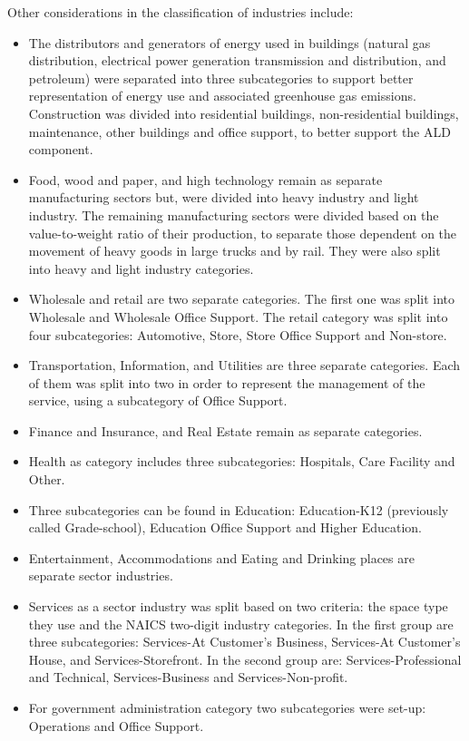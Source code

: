 
Other considerations in the classification of industries include:
\begin{itemize}
\item The distributors and generators of energy used in buildings (natural gas distribution, electrical power generation transmission and distribution, and petroleum) were separated into three subcategories to support better representation of energy use and associated greenhouse gas emissions. Construction was divided into residential buildings, non-residential buildings, maintenance, other buildings and office support, to better support the ALD component.
\item Food, wood and paper, and high technology remain as separate manufacturing sectors but, were divided into heavy industry and light industry. The remaining manufacturing sectors were divided based on the value-to-weight ratio of their production, to separate those dependent on the movement of heavy goods in large trucks and by rail. They were also split into heavy and light industry categories.
\item Wholesale and retail are two separate categories. The first one was split into Wholesale and Wholesale Office Support. The retail category was split into four subcategories: Automotive, Store, Store Office Support and Non-store.
\item Transportation, Information, and Utilities are three separate categories. Each of them was split into two in order to represent the management of the service, using a subcategory of Office Support.
\item Finance and Insurance, and Real Estate remain as separate categories.
\item Health as category includes three subcategories: Hospitals, Care Facility and Other.
\item Three subcategories can be found in Education: Education-K12 (previously called Grade-school), Education Office Support and Higher Education.
\item Entertainment, Accommodations and Eating and Drinking places are separate sector industries.
\item Services as a sector industry was split based on two criteria: the space type they use and the NAICS two-digit industry categories. In the first group are three subcategories: Services-At Customer's Business, Services-At Customer's House, and Services-Storefront. In the second group are: Services-Professional and Technical, Services-Business and Services-Non-profit.
\item For government administration category two subcategories were set-up: Operations and Office Support.
\end{itemize} 

